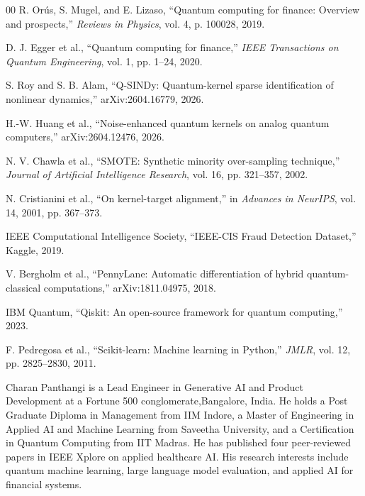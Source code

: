 \documentclass[journal]{IEEEtran}
\begin{document}
\begin{thebibliography}{00}
R. Or\'{u}s, S. Mugel, and E. Lizaso, 
``Quantum computing for finance: Overview and prospects,'' 
\textit{Reviews in Physics}, vol. 4, p. 100028, 2019.

D. J. Egger et al., ``Quantum computing for finance,'' 
\textit{IEEE Transactions on Quantum Engineering}, 
vol. 1, pp. 1--24, 2020.

S. Roy and S. B. Alam, ``Q-SINDy: Quantum-kernel sparse 
identification of nonlinear dynamics,'' 
arXiv:2604.16779, 2026.

H.-W. Huang et al., ``Noise-enhanced quantum kernels 
on analog quantum computers,'' arXiv:2604.12476, 2026.

N. V. Chawla et al., ``SMOTE: Synthetic minority 
over-sampling technique,'' 
\textit{Journal of Artificial Intelligence Research}, 
vol. 16, pp. 321--357, 2002.

N. Cristianini et al., ``On kernel-target alignment,'' 
in \textit{Advances in NeurIPS}, vol. 14, 2001, 
pp. 367--373.

IEEE Computational Intelligence Society, 
``IEEE-CIS Fraud Detection Dataset,'' Kaggle, 2019.

V. Bergholm et al., 
``PennyLane: Automatic differentiation of hybrid 
quantum-classical computations,'' arXiv:1811.04975, 2018.

IBM Quantum, ``Qiskit: An open-source framework for 
quantum computing,'' 2023.

F. Pedregosa et al., ``Scikit-learn: Machine learning 
in Python,'' \textit{JMLR}, vol. 12, 
pp. 2825--2830, 2011.

\end{thebibliography}

\begin{IEEEbiographynophoto}{Charan Panthangi}
is a Lead Engineer in Generative AI and Product Development 
at a Fortune 500 conglomerate,Bangalore, India. He holds 
a Post Graduate Diploma in Management from IIM Indore, 
a Master of Engineering in Applied AI and Machine Learning 
from Saveetha University, and a Certification in Quantum 
Computing from IIT Madras. He has published four 
peer-reviewed papers in IEEE Xplore on applied healthcare 
AI. His research interests include quantum machine learning, 
large language model evaluation, and applied AI for 
financial systems.
\end{IEEEbiographynophoto}
\end{document}
